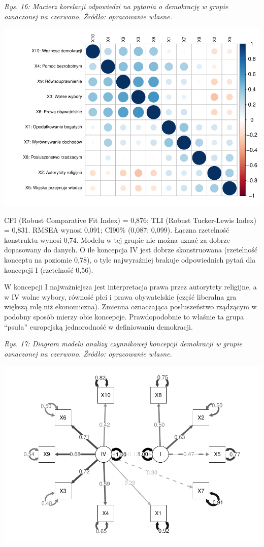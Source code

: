 \documentclass[12pt]{article}
\begin{document}
\emph{Rys. 16: Macierz korelacji odpowiedzi na pytania o demokrację w grupie oznaczonej na czerwono. Źródło: opracowanie własne.}

\begin{flushleft}\includegraphics{text_ASA_files/figure-latex/cor-matrix-3-1} \end{flushleft}

CFI (Robust Comparative Fit Index) = 0,876; TLI (Robust Tucker-Lewis Index) = 0,831. RMSEA wynosi 0,091; CI90\% (0,087; 0,099). Łączna rzetelność konstruktu wynosi 0,74. Modelu w tej grupie nie można uznać za dobrze dopasowany do danych. O ile koncepcja IV jest dobrze skonstruowana (rzetelność konceptu na poziomie 0,78), o tyle najwyraźniej brakuje odpowiednich pytań dla koncepcji I (rzetelność 0,56).

W koncepcji I najważniejsza jest interpretacja prawa przez autorytety religijne, a w IV wolne wybory, równość płci i prawa obywatelskie (część liberalna gra większą rolę niż ekonomiczna). Zmienna oznaczająca posłuszeństwo rządzącym w podobny sposób mierzy obie koncepcje. Prawdopodobnie to właśnie ta grupa ``psuła'' europejską jednorodność w definiowaniu demokracji.

\emph{Rys. 17: Diagram modelu analizy czynnikowej koncepcji demokracji w grupie oznaczonej na czerwono. Źródło: opracowanie własne.}

\begin{center}\includegraphics{text_ASA_files/figure-latex/diagram-3-1} \end{center}
\end{document}
